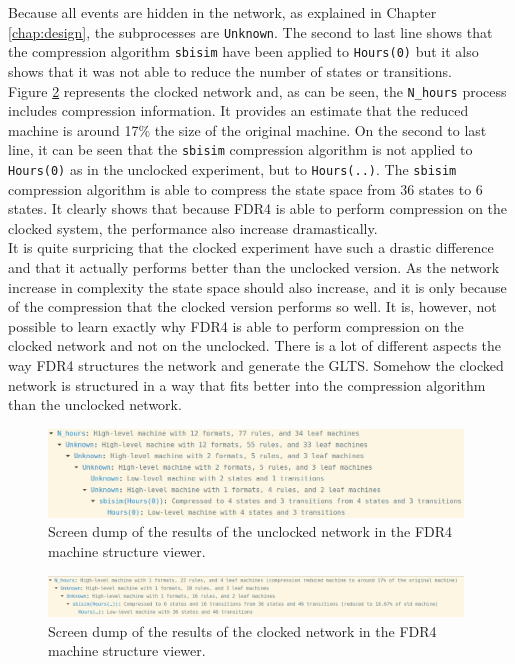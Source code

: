 Because all events are hidden in the network, as explained in Chapter \ref{chap:design}, the subprocesses are \texttt{Unknown}. The second to last line shows that the compression algorithm \texttt{sbisim} have been applied to \texttt{Hours(0)} but it also shows that it was not able to reduce the number of states or transitions. \\

Figure \ref{fig:clocked_compression} represents the clocked network and, as can be seen, the \texttt{N\_hours} process includes compression information. It provides an estimate that the reduced machine is around 17\% the size of the original machine. On the second to last line, it can be seen that the \texttt{sbisim} compression algorithm is not applied to \texttt{Hours(0)} as in the unclocked experiment, but to \texttt{Hours(..)}. The \texttt{sbisim} compression algorithm is able to compress the state space from 36 states to 6 states. It clearly shows that because FDR4 is able to perform compression on the clocked system, the performance also increase dramastically.\\

It is quite surpricing that the clocked experiment have such a drastic difference and that it actually performs better than the unclocked version. As the network increase in complexity the state space should also increase, and it is only because of the compression that the clocked version performs so well. It is, however, not possible to learn exactly why FDR4 is able to perform compression on the clocked network and not on the unclocked. There is a lot of different aspects the way FDR4 structures the network and generate the GLTS. Somehow the clocked network is structured in a way that fits better into the compression algorithm than the unclocked network.
\begin{figure}
    \includegraphics[width=0.98\textwidth]{./figures/unclocked_compression.jpg}
\caption{Screen dump of the results of the unclocked network in the FDR4 machine structure viewer.}
\label{fig:unclocked_compression}
\end{figure}
\begin{figure}
    \includegraphics[width=0.98\textwidth]{./figures/clocked_compression.jpg}
\caption{Screen dump of the results of the clocked network in the FDR4 machine structure viewer.}
\label{fig:clocked_compression}
\end{figure}

